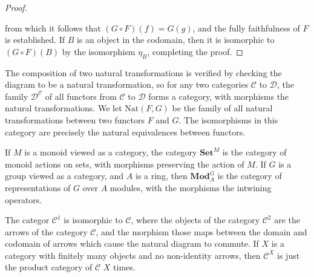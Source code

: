 \begin{proof}
    \begin{center}
    \end{center}
    from which it follows that $(G \circ F)(f) = G(g)$, and the fully faithfulness of $F$ is established. If $B$ is an object in the codomain, then it is isomorphic to $(G \circ F)(B)$ by the isomorphism $\eta_B$, completing the proof.
\end{proof}

The composition of two natural transformations is verified by checking the diagram to be a natural transformation, so for any two categories $\mathcal{C}$ to $\mathcal{D}$, the family $\mathcal{D}^{\mathcal{C}}$ of all functors from $\mathcal{C}$ to $\mathcal{D}$ forms a category, with morphisms the natural transformations. We let $\text{Nat}(F,G)$ be the family of all natural transformations between two functors $F$ and $G$. The isomorphisms in this category are precisely the natural equivalences between functors.

\begin{example}
    If $M$ is a monoid viewed as a category, the category $\textbf{Set}^M$ is the category of monoid actions on sets, with morphisms preserving the action of $M$. If $G$ is a group viewed as a category, and $A$ is a ring, then $\textbf{Mod}_A^G$ is the category of representations of $G$ over $A$ modules, with the morphisms the intwining operators.
\end{example}

\begin{example}
    The categor $\mathcal{C}^1$ is isomorphic to $\mathcal{C}$, where the objects of the category $\mathcal{C}^2$ are the arrows of the category $\mathcal{C}$, and the morphism those maps between the domain and codomain of arrows which cause the natural diagram to commute. If $X$ is a category with finitely many objects and no non-identity arrows, then $\mathcal{C}^X$ is just the product category of $\mathcal{C}$ $X$ times.
\end{example}

